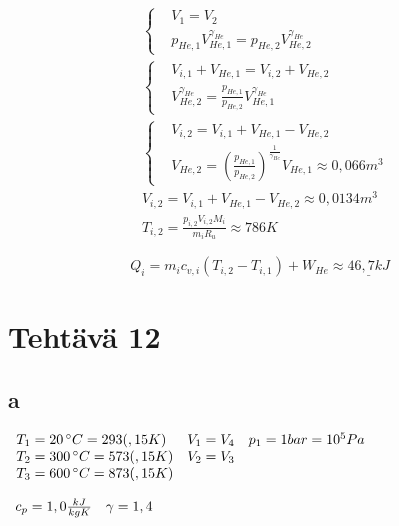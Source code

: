 \documentclass[12pt,a4paper,finnish]{article}
\begin{document}
\begin{align}
 &\left\{
 \begin{aligned}
  &V_1 = V_2\\
  &p_{He, 1}V_{He, 1}^{\gamma_{He}} = p_{He, 2}V_{He, 2}^{\gamma_{He}}
 \end{aligned}\right.\\
 &\left\{
 \begin{aligned}
  &V_{i, 1} + V_{He, 1} = V_{i, 2} + V_{He, 2}\\
  &V_{He, 2}^{\gamma_{He}} = \frac{p_{He, 1}}{p_{He, 2}}V_{He, 1}^{\gamma_{He}}
 \end{aligned}\right.\\
 &\left\{
 \begin{aligned}
  &V_{i, 2} = V_{i, 1} + V_{He, 1} - V_{He, 2}\\
  &V_{He, 2} = \left(\frac{p_{He, 1}}{p_{He, 2}}\right)^{\frac{1}{\gamma_{He}}}V_{He, 1} \approx 0,066m^3
 \end{aligned}\right.\\
 &V_{i, 2} = V_{i, 1} + V_{He, 1} - V_{He, 2} \approx 0,0134m^3\\
 &T_{i, 2} = \frac{p_{i,2}V_{i, 2}M_i}{m_iR_u} \approx 786 K
\end{align}

\begin{equation}
 Q_i = m_ic_{v, i}(T_{i, 2} - T_{i, 1}) + W_{He} \approx \underline{46,7 kJ}
\end{equation}

\section{Tehtävä 12}

\subsection{a}

\begin{math}
 \begin{array}{l l l}
  T_1 = 20 \,^{\circ}C = 293(,15 K) & V_1 = V_4 & p_1 = 1 bar = 10^5 Pa\\
  T_2 = 300 \,^{\circ}C = 573(,15 K) & V_2 = V_3 &\\
  T_3 = 600 \,^{\circ}C = 873(,15 K) &  & \\
 \end{array}
\end{math}

\begin{math}
 \begin{array}{l l}
  c_p = 1,0 \frac{kJ}{kgK} & \gamma = 1,4\\
 \end{array}
\end{math}
\end{document}
